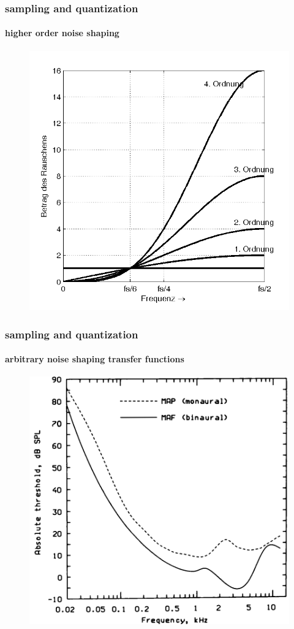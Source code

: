	\begin{frame}\frametitle{sampling and quantization}\framesubtitle{higher order noise shaping}
		\begin{figure}
			\centering
				\includegraphics[scale=0.6]{Graph/noiseshaping}
		\end{figure}
	\end{frame}
	
	\begin{frame}\frametitle{sampling and quantization}\framesubtitle{arbitrary noise shaping transfer functions}
		\begin{figure}
			\centering
				\includegraphics[scale=0.3]{Graph/ATH}
		\end{figure}
	\end{frame}
	
